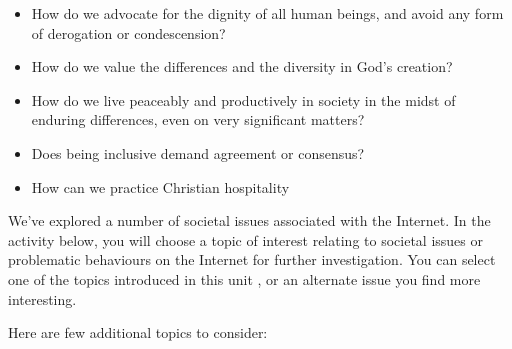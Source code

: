 \documentclass[
]{book}
\providecommand{\tightlist}{%
  \setlength{\itemsep}{0pt}\setlength{\parskip}{0pt}}
\theoremstyle{definition}
\theoremstyle{definition}
\theoremstyle{definition}
\theoremstyle{definition}
\theoremstyle{remark}
\begin{document}
\begin{reflect}
\begin{itemize}
\tightlist
\item
  How do we advocate for the dignity of all human beings, and avoid any form of derogation or condescension?\\
\item
  How do we value the differences and the diversity in God's creation?
\item
  How do we live peaceably and productively in society in the midst of enduring differences, even on very significant matters?
\item
  Does being inclusive demand agreement or consensus?\\
\item
  How can we practice Christian hospitality
\end{itemize}
\end{reflect}

We've explored a number of societal issues associated with the Internet. In the activity below, you will choose a topic of interest relating to societal issues or problematic behaviours on the Internet for further investigation. You can select one of the topics introduced in this unit , or an alternate issue you find more interesting.

Here are few additional topics to consider:
\end{document}
